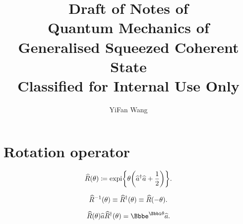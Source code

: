 \documentclass[a4paper]{article}
\title{Draft of Notes of\\Quantum Mechanics of\\Generalised Squeezed Coherent 
State\\Classified for Internal Use Only}
\author{YiFan Wang}
\begin{document}
\maketitle


\tableofcontents

\section{Rotation operator}

\begin{equation}
{\widehat{R}}\mathopen{}\left(\theta\right)\mathclose{} \coloneqq {\operatorname{expi}}\mathopen{}\left\{\theta 
	{\left(\widehat{a}^\dagger \widehat{a}+\frac{1}{2}\right)}\right\}\mathclose{}.
\end{equation}

\begin{equation}
	{\widehat{R}^{-1}}\mathopen{}\left(\theta\right)\mathclose{} \equiv {\widehat{R}^\dagger}\mathopen{}\left(\theta\right)\mathclose{}
	\equiv {\widehat{R}}\mathopen{}\left(-\theta\right)\mathclose{}.
\end{equation}

\begin{equation}
	\rfun{\widehat{R}}{\theta}\widehat{a}\rfun{\widehat{R}^\dagger}{\theta}
	= \ee^{\ii\theta}\widehat{a}.
\end{equation}








%

\appendix









\end{document}
